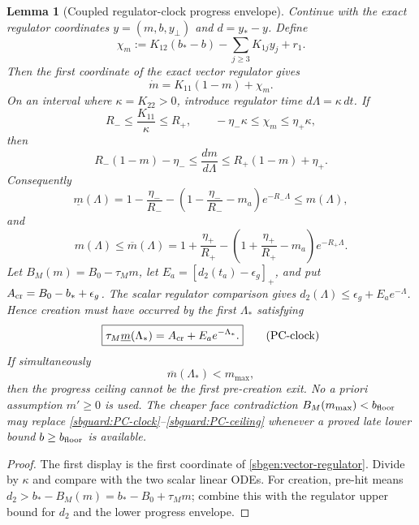 \documentclass{article} %
\theoremstyle{plain}
\newtheorem{lemma}[theorem]{Lemma}
\theoremstyle{definition}
\theoremstyle{remark}
\begin{document}
\begin{lemma}[Coupled regulator-clock progress envelope]
\label{sbguard:progress-envelope}
Continue with the exact regulator coordinates
$y=(m,b,y_\perp)$ and $d=y_*-y$.  Define
\[
 \chi_m:=K_{12}(b_*-b)-\sum_{j\ge3}K_{1j}y_j+r_1.
\]
Then the first coordinate of the exact vector regulator gives
\[
\boxed{\dot m=K_{11}(1-m)+\chi_m.}
\tag{progress-exact}\label{sbguard:progress-exact}
\]
On an interval where $\kappa=K_{22}>0$, introduce regulator time
$d\Lambda=\kappa\,dt$.  If
\[
 R_-\le\frac{K_{11}}\kappa\le R_+,
 \qquad
 -\eta_-\kappa\le\chi_m\le\eta_+\kappa,
\]
then
\[
 R_-(1-m)-\eta_-
 \le\frac{dm}{d\Lambda}
 \le R_+(1-m)+\eta_+.
\]
Consequently
\[
\boxed{
 \underline m(\Lambda)
 =1-\frac{\eta_-}{R_-}
 -\left(1-\frac{\eta_-}{R_-}-m_a\right)e^{-R_-\Lambda}
 \le m(\Lambda),
}
\tag{progress-lower}\label{sbguard:progress-lower}
\]
and
\[
\boxed{
 m(\Lambda)\le
 \overline m(\Lambda)
 =1+\frac{\eta_+}{R_+}
 -\left(1+\frac{\eta_+}{R_+}-m_a\right)e^{-R_+\Lambda}.
}
\tag{progress-upper}\label{sbguard:progress-upper}
\]
Let $B_M(m)=B_0-\tau_Mm$, let
$E_a=[d_2(t_a)-\epsilon_g]_+$, and put
$A_{\rm cr}=B_0-b_*+\epsilon_g$.  The scalar regulator comparison gives
$d_2(\Lambda)\le\epsilon_g+E_ae^{-\Lambda}$.  Hence creation must have
occurred by the first $\Lambda_*$ satisfying
\[
\boxed{
 \tau_M\underline m(\Lambda_*)
 =A_{\rm cr}+E_ae^{-\Lambda_*}.
}
\tag{PC-clock}\label{sbguard:PC-clock}
\]
If simultaneously
\[
\boxed{\overline m(\Lambda_*)<m_{\max},}
\tag{PC-ceiling}\label{sbguard:PC-ceiling}
\]
then the progress ceiling cannot be the first pre-creation exit.  No a priori
assumption $m'\ge0$ is used.  The cheaper face contradiction
$B_M(m_{\max})<b_{\rm floor}$ may replace
\eqref{sbguard:PC-clock}--\eqref{sbguard:PC-ceiling} whenever a proved late
lower bound $b\ge b_{\rm floor}$ is available.
\end{lemma}
\begin{proof}
The first display is the first coordinate of
\eqref{sbgen:vector-regulator}.  Divide by $\kappa$ and compare with the two
scalar linear ODEs.  For creation, pre-hit means
$d_2>b_*-B_M(m)=b_*-B_0+\tau_Mm$; combine this with the regulator upper
bound for $d_2$ and the lower progress envelope.
\end{proof}
\end{document}
